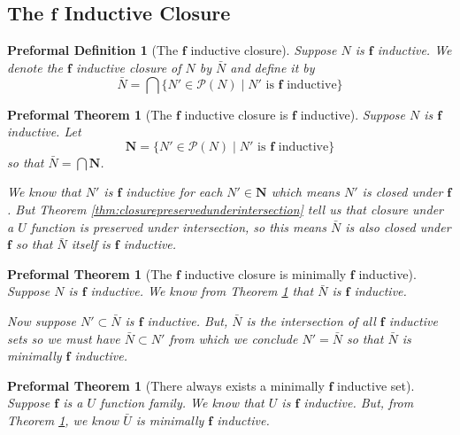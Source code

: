 \documentclass[oneside, 12pt]{book}
\theoremstyle{break}
\newtheorem{preformal definition}[definition]{Preformal Definition}
\newtheorem{preformal theorem}[theorem]{Preformal Theorem}
\newcommand{\bv}[1]{\boldsymbol{#1}}
\newcommand{\mc}[1]{\mathcal{#1}}
\begin{document}
			\subsection{The $\bv{f}$ Inductive Closure}
				\begin{preformal definition}[The $\bv{f}$ inductive closure]
					Suppose $N$ is $\bv{f}$ inductive.
					We denote the $\bv{f}$ inductive closure of $N$ by $\bar{N}$ and define it by
					\begin{equation*}
						\bar{N} = \bigcap \{N' \in \mc{P}(N) \mid N' \text{ is } \bv{f} \text{ inductive}\}
					\end{equation*}
				\end{preformal definition}
				
				\begin{preformal theorem}[The $\bv{f}$ inductive closure is $\bv{f}$ inductive]
					\label{thm:inductive closure is inductive}
					Suppose $N$ is $\bv{f}$ inductive.
					Let
					\begin{equation*}
						\bv{N} = \{N' \in \mc{P}(N) \mid N' \text{ is } \bv{f} \text{ inductive}\}
					\end{equation*}
					so that $\bar{N} = \bigcap \bv{N}$.
					
					We know that $N'$ is $\bv{f}$ inductive for each $N'\in \bv{N}$ which means $N'$ is closed under $\bv{f}$.
					But Theorem \ref{thm:closurepreservedunderintersection} tell us that closure under a $U$ function is preserved under intersection, so this means $\bar{N}$ is also closed under $\bv{f}$ so that $\bar{N}$ itself is $\bv{f}$ inductive.
				\end{preformal theorem}
			
				\begin{preformal theorem}[The $\bv{f}$ inductive closure is minimally $\bv{f}$ inductive]
					\label{thm:inductive closure is minimally inductive}
					Suppose $N$ is $\bv{f}$ inductive.
					We know from Theorem \ref{thm:inductive closure is inductive} that $\bar{N}$ is $\bv{f}$ inductive.
					
					Now suppose $N' \subset \bar{N}$ is $\bv{f}$ inductive.
					But, $\bar{N}$ is the intersection of all $\bv{f}$ inductive sets so we must have $\bar{N} \subset N'$ from which we conclude $N' = \bar{N}$ so that $\bar{N}$ is minimally $\bv{f}$ inductive.
				\end{preformal theorem}
			
				\begin{preformal theorem}[There always exists a minimally $\bv{f}$ inductive set]
						\label{thm:there exists a minimally inductive set}
						Suppose $\bv{f}$ is a $U$ function family. 
						We know that $U$ is $\bv{f}$ inductive.
						But, from Theorem \ref{thm:inductive closure is minimally inductive}, we know $\bar{U}$ is minimally $\bv{f}$ inductive.
				\end{preformal theorem}
				
\end{document}
